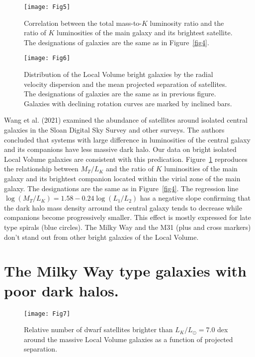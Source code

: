\documentclass[proof]{WileyASNA-v1}
\begin{document}
\begin{figure}[t]
\centerline{\texttt{[image: Fig5]}}
\caption{Correlation between the total mass-to-$K$ luminosity ratio and the
ratio of $K$ luminosities of the main galaxy and its brightest satellite. The
designations of galaxies are the same as in Figure~\ref{fig4}.\label{fig5}}
\end{figure}

\begin{figure}[t]
\centerline{\texttt{[image: Fig6]}}
\caption{Distribution of the Local Volume bright galaxies by the radial velocity
dispersion and the mean projected separation of satellites. The designations of
galaxies are the same as in previous figure. Galaxies with declining rotation
curves are marked by inclined bars.\label{fig6}}
\end{figure}

Wang et al. (2021) examined the abundance of satellites around isolated central
galaxies in the Sloan Digital Sky Survey and other surveys. The authors
concluded that systems with large difference in luminosities of the central
galaxy and its companions have less massive dark halo. Our data on bright
isolated Local Volume galaxies are consistent with this predication.
Figure~\ref{fig5} reproduces the relationship between $M_T/L_K$ and the ratio of
$K$ luminosities of the main galaxy and its brightest companion located within
the virial zone of the main galaxy. The designations are the same as in
Figure~\ref{fig4}. The regression line $\log(M_T/L_K) = 1.58-0.24\log(L_1/L_2)$
has a negative slope confirming that the dark halo mass density arround the
central galaxy tends to decrease while companions become progressively smaller.
This effect is mostly expressed for late type spirals (blue circles). The Milky
Way and the M31 (plus and cross markers) don't stand out from other bright
galaxies of the Local Volume.

\section{The Milky Way type galaxies with poor dark halos.}\label{sec4}

\begin{figure*}[t]
\centerline{\texttt{[image: Fig7]}}
\caption{Relative number of dwarf satellites brighter than $L_K/L_{\odot} = 7.0$
dex around the massive Local Volume galaxies as a function of projected
separation.\label{fig7}}
\end{figure*}
\end{document}
